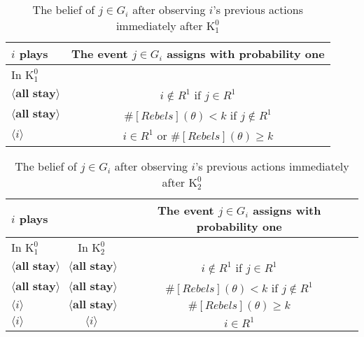 \documentclass[12pt,letter]{article}
\newcommand{\Kappa}{\mathrm{K}}
\theoremstyle{definition}
\theoremstyle{remark}
\theoremstyle{claim}
\begin{document}
\begin{table}[!htbp]
\caption{The belief of $j\in G_i$ after observing $i$'s previous actions immediately after $\Kappa^0_{1}$}
\label{Table_blf_up_cd01}
\begin{center}
\begin{tabular}{l | c}
 	$i$ plays	  				  &  The event $j\in G_i$ assigns with probability one\\
\hline
\hline
In $\Kappa^0_{1}$	&				  \\
\hline
  $\langle \textbf{all stay} \rangle$	&    $i\notin R^1$ if $j\in R^1$ \\
  $\langle \textbf{all stay} \rangle$	&    $\#[Rebels](\theta)< k$ if $j\notin R^1$\\
  $\langle i \rangle$	&	  $i\in R^1$ or $\#[Rebels](\theta)\geq k$    \\
  \hline
\end{tabular}
\end{center}
\end{table}

\begin{table}[!htbp]
\caption{The belief of $j\in G_i$ after observing $i$'s previous actions immediately after $\Kappa^0_{2}$}
\label{Table_blf_up_cd02}
\begin{center}
\begin{tabular}{l  c | c}
 	$i$ plays	  	&  	  &The event $j\in G_i$ assigns with probability one \\
\hline
\hline
	In $\Kappa^0_{1}$		&			In $\Kappa^0_{2}$	&  \\
\hline
  $\langle \textbf{all stay} \rangle$	&  $\langle \textbf{all stay} \rangle$ &  $i\notin R^1$ if $j\in R^1$ \\
  $\langle \textbf{all stay} \rangle$	&  $\langle \textbf{all stay} \rangle$ &  $\#[Rebels](\theta)< k$ if $j\notin R^1$\\
  $\langle i \rangle$	&	$\langle \textbf{all stay} \rangle$ &  $\#[Rebels](\theta)\geq k$    \\
  $\langle i \rangle$	&	$\langle i \rangle$ &  $i\in R^1$  \\
  \hline
\end{tabular}
\end{center}
\end{table}

\clearpage
\end{document}

